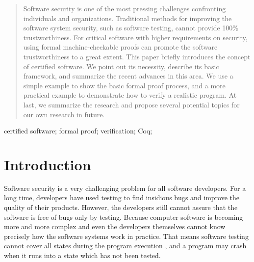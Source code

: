 \documentclass[10pt, conference, compsocconf]{IEEEtran}
\begin{document}
\begin{abstract}



Software security is one of the most pressing challenges confronting individuals and organizations. Traditional methods for improving the software system security, such as software testing, cannot provide 100\% trustworthiness. For critical software with higher requirements on security, using formal machine-checkable proofs can promote the software trustworthiness to a great extent. This paper briefly introduces the concept of certified software. We point out its necessity, describe its basic framework, and summarize the recent advances in this area. We use a simple example to show the basic formal proof process, and a more practical example to demonstrate how to verify a realistic program. At last, we summarize the research and propose several potential topics for our own research in future.
 
\end{abstract}

\begin{IEEEkeywords}
certified software; formal proof; verification; Coq;

\end{IEEEkeywords}


%
\IEEEpeerreviewmaketitle



\section{Introduction}
Software security is a very challenging problem for all software developers. For a long time, developers have used testing to find insidious bugs and improve the quality of their products. However, the developers still cannot assure that the software is free of bugs only by testing. Because computer software is becoming more and more complex and even the developers themselves cannot know precisely how the software systems work in practice. That means software testing cannot cover all states during the program execution \cite{shao}, and a program may crash when it runs into a state which has not been tested.
\end{document}
